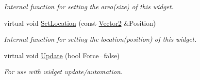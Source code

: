 \begin{DoxyCompactItemize}
\begin{DoxyCompactList}\small\item\em Internal function for setting the area(size) of this widget. \item\end{DoxyCompactList}\item 
\hypertarget{classphys_1_1UI_1_1Spinner_a27c0c8ab2d9dd70df0a2a4536718bbe8}{
virtual void \hyperlink{classphys_1_1UI_1_1Spinner_a27c0c8ab2d9dd70df0a2a4536718bbe8}{SetLocation} (const \hyperlink{classphys_1_1Vector2}{Vector2} \&Position)}
\label{classphys_1_1UI_1_1Spinner_a27c0c8ab2d9dd70df0a2a4536718bbe8}

\begin{DoxyCompactList}\small\item\em Internal function for setting the location(position) of this widget. \item\end{DoxyCompactList}\item 
\hypertarget{classphys_1_1UI_1_1Spinner_a9f19c47509ab45d47807d25b919f8af2}{
virtual void \hyperlink{classphys_1_1UI_1_1Spinner_a9f19c47509ab45d47807d25b919f8af2}{Update} (bool Force=false)}
\label{classphys_1_1UI_1_1Spinner_a9f19c47509ab45d47807d25b919f8af2}

\begin{DoxyCompactList}\small\item\em For use with widget update/automation. \item\end{DoxyCompactList}\end{DoxyCompactItemize}
